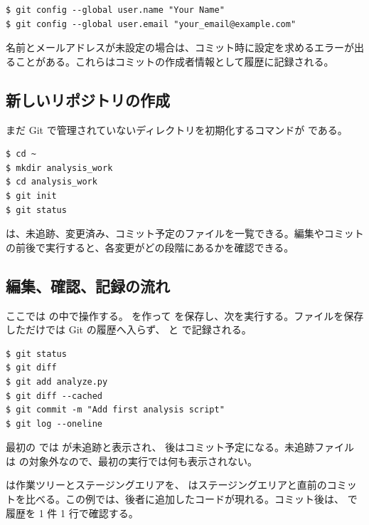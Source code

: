 \begin{lstlisting}[numbers=none, xleftmargin=2\zw]
$ git config --global user.name "Your Name"
$ git config --global user.email "your_email@example.com"
\end{lstlisting}

名前とメールアドレスが未設定の場合は、コミット時に設定を求めるエラーが出ることがある。これらはコミットの作成者情報として履歴に記録される。

\subsection{新しいリポジトリの作成}

まだ Git で管理されていないディレクトリを初期化するコマンドが  である。

\begin{lstlisting}[numbers=none, xleftmargin=2\zw]
$ cd ~
$ mkdir analysis_work
$ cd analysis_work
$ git init
$ git status
\end{lstlisting}

 は、未追跡、変更済み、コミット予定のファイルを一覧できる。編集やコミットの前後で実行すると、各変更がどの段階にあるかを確認できる。

\subsection{編集、確認、記録の流れ}

ここでは  の中で操作する。 を作って  を保存し、次を実行する。ファイルを保存しただけでは Git の履歴へ入らず、 と  で記録される。

\begin{lstlisting}[numbers=none, xleftmargin=2\zw]
$ git status
$ git diff
$ git add analyze.py
$ git diff --cached
$ git commit -m "Add first analysis script"
$ git log --oneline
\end{lstlisting}

最初の  では  が未追跡と表示され、 後はコミット予定になる。未追跡ファイルは  の対象外なので、最初の実行では何も表示されない。

 は作業ツリーとステージングエリアを、 はステージングエリアと直前のコミットを比べる。この例では、後者に追加したコードが現れる。コミット後は、 で履歴を 1 件 1 行で確認する。

